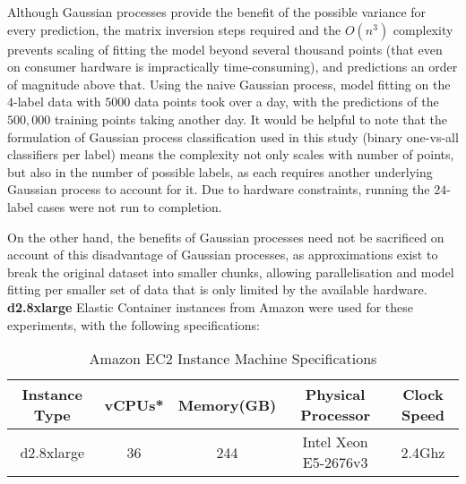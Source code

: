 Although Gaussian processes provide the benefit of the possible variance for every prediction, the matrix inversion steps required and the $O(n^3)$ complexity prevents scaling of fitting the model beyond several thousand points (that even on consumer hardware is impractically time-consuming), and predictions an order of magnitude above that. Using the naive Gaussian process, model fitting on the $4$-label data with $5000$ data points took over a day, with the predictions of the $500,000$ training points taking another day. It would be helpful to note that the formulation of Gaussian process classification used in this study (binary one-vs-all classifiers per label) means the complexity not only scales with number of points, but also in the number of possible labels, as each requires another underlying Gaussian process to account for it. Due to hardware constraints, running the $24$-label cases were not run to completion.

On the other hand, the benefits of Gaussian processes need not be sacrificed on account of this disadvantage of Gaussian processes, as approximations exist to break the original dataset into smaller chunks, allowing parallelisation and model fitting per smaller set of data that is only limited by the available hardware. \textbf{d2.8xlarge} Elastic Container instances from Amazon were used for these experiments, with the following specifications:

\begin{table}[H]
    \centering
    \begin{tabular}{|c|c|c|c|c|}
        \hline
        Instance Type & vCPUs* & Memory(GB) & Physical Processor & Clock Speed \\\hline
        d2.8xlarge & 36 & 244 & Intel Xeon E5-2676v3 & 2.4Ghz\\\hline
    \end{tabular}
    \label{table:ec2specs}
    \caption{Amazon EC2 Instance Machine Specifications}
\end{table}

